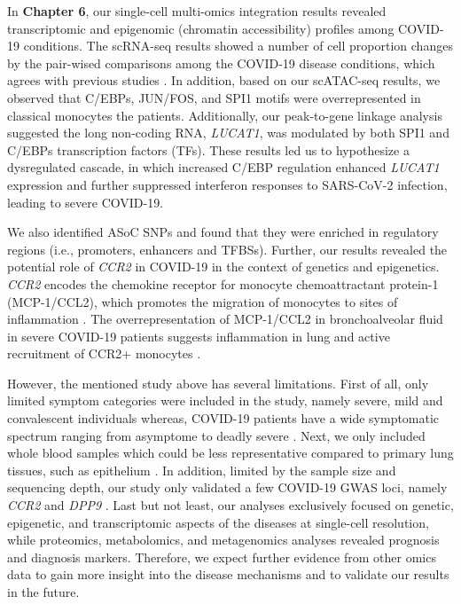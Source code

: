 \documentclass{book}
\begin{document}
\begin{refsection}
In \textbf{Chapter 6}, our single-cell multi-omics integration results revealed transcriptomic and epigenomic (chromatin accessibility) profiles among COVID-19 conditions.
The scRNA-seq results showed a number of cell proportion changes by the pair-wised comparisons among the COVID-19 disease conditions, which agrees with previous studies \cite{Zhang2020Single,Schulte2020Severe,Stephenson2021Single}.
In addition, based on our scATAC-seq results, we observed that C/EBPs, JUN/FOS, and SPI1 motifs were overrepresented in classical monocytes the patients.
Additionally, our peak-to-gene linkage analysis suggested the long non-coding RNA, \textit{LUCAT1}, was modulated by both SPI1 and C/EBPs transcription factors (TFs).
These results led us to hypothesize a dysregulated cascade, in which increased C/EBP regulation enhanced \textit{LUCAT1} expression and further suppressed interferon responses to SARS-CoV-2 infection, leading to severe COVID-19.

We also identified ASoC SNPs and found that they were enriched in regulatory regions (i.e., promoters, enhancers and TFBSs).
Further, our results revealed the potential role of \textit{CCR2} in COVID-19 in the context of genetics and epigenetics.
\textit{CCR2} encodes the chemokine receptor for monocyte chemoattractant protein-1 (MCP-1/CCL2), which promotes the migration of monocytes to sites of inflammation \cite{Serbina2006Monocyte}.
The overrepresentation of MCP-1/CCL2 in bronchoalveolar fluid in severe COVID-19 patients suggests inflammation in lung and active recruitment of CCR2+ monocytes \cite{Zhou2020Heightened}.

However, the mentioned study above has several limitations.
First of all, only limited symptom categories were included in the study, namely severe, mild and convalescent individuals whereas, COVID-19 patients have a wide symptomatic spectrum ranging from asymptome to deadly severe \cite{Eythorsson2020Clinical,Guan2020Clinical,Rodriguez2020Clinical,Wu2020Characteristics}.
Next, we only included whole blood samples which could be less representative compared to primary lung tissues, such as epithelium \cite{Mulay2021SARS}.
In addition, limited by the sample size and sequencing depth, our study only validated a few COVID-19 GWAS loci, namely \textit{CCR2} and \textit{DPP9} \cite{Pairo2020Genetic}.
Last but not least, our analyses exclusively focused on genetic, epigenetic, and transcriptomic aspects of the diseases at single-cell resolution, while proteomics, metabolomics, and metagenomics \cite{McArdle2021Discovery,Hasan2021Metabolomics,Ma2021Metagenomic} analyses revealed prognosis and diagnosis markers.
Therefore, we expect further evidence from other omics data to gain more insight into the disease mechanisms and to validate our results in the future.



\end{refsection}
\end{document}

